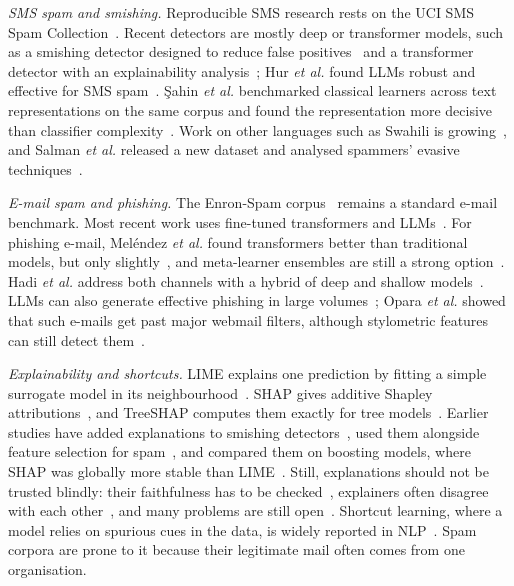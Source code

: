 \documentclass[conference]{IEEEtran}
\begin{document}
\emph{SMS spam and smishing.} Reproducible SMS research rests on the UCI SMS
Spam Collection~\cite{almeida2011sms}. Recent detectors are mostly deep or
transformer models, such as a smishing detector designed to reduce false
positives~\cite{mehmood2024smishing} and a transformer detector with an
explainability analysis~\cite{uddin2025explainabledetector}; Hur \emph{et al.}
found LLMs robust and effective for SMS spam~\cite{hur2026llm}. \c{S}ahin
\emph{et al.} benchmarked classical learners across text representations on
the same corpus and found the representation more decisive than classifier
complexity~\cite{sahin2026revisiting}. Work on other languages such as Swahili
is growing~\cite{mambina2024swahili}, and Salman \emph{et al.} released a new
dataset and analysed spammers' evasive techniques~\cite{salman2024evasive}.

\emph{E-mail spam and phishing.} The Enron-Spam corpus~\cite{metsis2006spam}
remains a standard e-mail benchmark. Most recent work uses fine-tuned transformers and
LLMs~\cite{jamal2024improved,roumeliotis2024next,uddin2026explainable,koide2026chatspamdetector}.
For phishing e-mail, Mel\'{e}ndez \emph{et al.} found transformers better than
traditional models, but only slightly~\cite{melendez2024comparative}, and
meta-learner ensembles are still a strong option~\cite{kshirsagar2025metalearner}.
Hadi \emph{et al.} address both channels with a hybrid of deep and shallow
models~\cite{hadi2026hybrid}. LLMs can also generate effective phishing in large
volumes~\cite{heiding2024devising}; Opara \emph{et al.} showed that such e-mails
get past major webmail filters, although stylometric features can still detect
them~\cite{opara2025evaluating}.

\emph{Explainability and shortcuts.} LIME explains one prediction by fitting a
simple surrogate model in its neighbourhood~\cite{ribeiro2016lime}. SHAP gives
additive Shapley attributions~\cite{lundberg2017shap}, and TreeSHAP computes
them exactly for tree models~\cite{lundberg2020treeshap}. Earlier studies have
added explanations to smishing
detectors~\cite{prince2026explainable,jasim2026fuzzy}, used them alongside feature selection for spam~\cite{shambour2025quantum}, and compared them on boosting
models, where SHAP was globally more stable than LIME~\cite{panthi2026shaplime}.
Still, explanations should not be trusted blindly: their faithfulness has to be
checked~\cite{lyu2024faithful}, explainers often disagree with each
other~\cite{krishna2024disagreement}, and many problems are still
open~\cite{longo2024xai}. Shortcut learning, where a model relies on spurious
cues in the data, is widely reported in
NLP~\cite{du2024shortcut,dogra2024shortcut}. Spam corpora are prone to it
because their legitimate mail often comes from one organisation.
\end{document}
